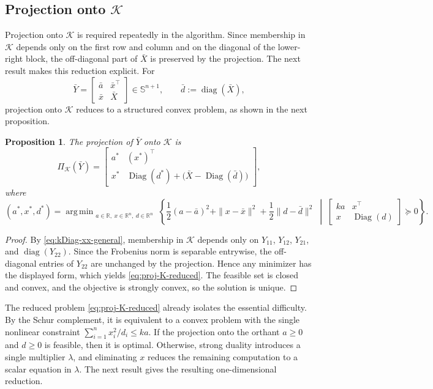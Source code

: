 \documentclass[11pt]{article}
\DeclareMathOperator{\diag}{diag}
\DeclareMathOperator{\Diag}{Diag}
\DeclareMathOperator*{\argmin}{arg\,min}
\def\K{\mathcal{K}}
\def\R{\mathbb{R}}
\def\S{\mathbb{S}}
\theoremstyle{plain}
\newtheorem{proposition}{Proposition}
\begin{document}
\subsection{Projection onto \texorpdfstring{$\K$}{K}}\label{subsec:projection-K}

Projection onto $\K$ is required repeatedly in the algorithm. Since membership in $\K$ depends only on the first row and column and on the diagonal of the lower-right block, the off-diagonal part of $\bar X$ is preserved by the projection. The next result makes this reduction explicit. For
\[
\bar Y=
\begin{bmatrix}
\bar a & \bar x^\top\\
\bar x & \bar X
\end{bmatrix}\in \S^{n+1},
\qquad
\bar d:=\diag(\bar X),
\]
projection onto $\K$ reduces to a structured convex problem, as shown in 
the next proposition.

\begin{proposition}\label{prop:proj-K-reduced}
The projection of $\bar Y$ onto $\K$ is
\[
\Pi_{\K}(\bar Y)=
\begin{bmatrix}
a^* & (x^*)^\top\\
x^* & \Diag(d^*)+\bigl(\bar X-\Diag(\bar d)\bigr)
\end{bmatrix},
\]
where 
\begin{equation}
\label{eq:proj-K-reduced}
(a^*,x^*,d^*) =
\argmin_{\substack{a\in \R,\ x\in\R^n,\ d \in \R^n}}
\left\{
\frac12(a-\bar a)^2+\|x-\bar x\|^2+\frac12\|d-\bar d\|^2
\;\middle|\;
\begin{bmatrix}
ka & x^\top\\
x & \Diag(d)
\end{bmatrix}\succeq 0
\right\}.
\end{equation}
\end{proposition}

\begin{proof}\;
By \eqref{eq:kDiag-xx-general}, membership in $\K$ depends only on $Y_{11}$, $Y_{12}$, $Y_{21}$, and $\diag(Y_{22})$. Since the Frobenius norm is separable entrywise, the off-diagonal entries of $Y_{22}$ are unchanged by the projection. Hence any minimizer has the displayed form, which yields \eqref{eq:proj-K-reduced}. The feasible set is closed and convex, and the objective is strongly convex, so the solution is unique.
\end{proof}




The reduced problem \eqref{eq:proj-K-reduced} already isolates the essential difficulty. By the Schur complement, it is equivalent to a convex problem with the single nonlinear constraint $\sum_{i=1}^n x_i^2/d_i\le ka$. If the projection onto the orthant $a\ge 0$ and $d\ge 0$ is feasible, then it is optimal. Otherwise, strong duality introduces a single multiplier $\lambda$, and eliminating $x$ reduces the remaining computation to a scalar equation in $\lambda$. The next result gives the resulting one-dimensional reduction.
\end{document}
